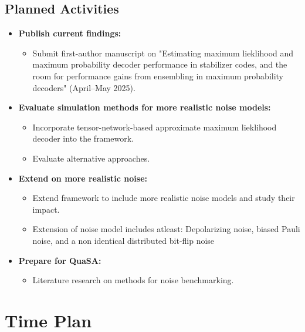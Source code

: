 \documentclass[11pt,a4paper]{article}
\begin{document}
\subsection*{Planned Activities}

\begin{itemize}[leftmargin=1.5em]
    \item \textbf{Publish current findings:}
    \begin{itemize}
        \item Submit first-author manuscript on "Estimating maximum lieklihood and maximum probability decoder performance in stabilizer codes, and the room for performance gains from ensembling in maximum probability decoders" (April–May 2025).
    \end{itemize}

    \item \textbf{Evaluate simulation methods for more realistic noise models:}
    \begin{itemize}
        \item Incorporate tensor-network-based approximate maximum lieklihood decoder into the framework.
        \item Evaluate alternative approaches.
    \end{itemize}

    \item \textbf{Extend on more realistic noise:}
    \begin{itemize}
        \item Extend framework to include more realistic noise models and study their impact.
        \item Extension of noise model includes atleast: Depolarizing noise, biased Pauli noise, and a non identical distributed bit-flip noise
    \end{itemize}

    \item \textbf{Prepare for QuaSA:}
    \begin{itemize}
        \item Literature research on methods for noise benchmarking.
    \end{itemize}
\end{itemize}

\newpage

\section*{Time Plan}
\end{document}
